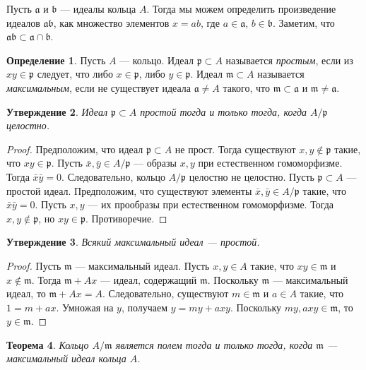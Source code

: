 \documentclass[12pt, titlepage, oneside]{amsbook}
\newcommand{\aaa}{\mathfrak{a}}
\newcommand{\bbb}{\mathfrak{b}}
\newcommand{\ppp}{\mathfrak{p}}
\newcommand{\mmm}{\mathfrak{m}}
\newtheorem{theorem}{Теорема}[chapter]
\newtheorem{claim}[theorem]{Утверждение}
\theoremstyle{definition}
\newtheorem{definition}[theorem]{Определение}
\theoremstyle{remark}
\begin{document}
Пусть $\aaa$ и $\bbb$ --- идеалы кольца $A$. Тогда мы можем определить произведение идеалов $\aaa\bbb$, как множество элементов $x=ab$, где $a\in\aaa$, $b\in\bbb$. Заметим, что $\aaa\bbb\subset\aaa\cap\bbb$.

\begin{definition}
	Пусть $A$ --- кольцо. Идеал $\ppp\subset A$ называется \emph{простым}, если из $xy\in\ppp$ следует, что либо $x\in\ppp$, либо $y\in\ppp$. Идеал $\mmm\subset A$ называется \emph{максимальным}, если не существует идеала $\aaa\neq A$ такого, что $\mmm\subset\aaa$ и $\mmm\neq\aaa$.
\end{definition}

\begin{claim}
	\label{KomKol1}
	Идеал $\ppp\subset A$ простой тогда и только тогда, когда $A/\ppp$ целостно.
\end{claim}

\begin{proof}
	Предположим, что идеал $\ppp\subset A$ не прост. Тогда существуют $x,y\not\in\ppp$ такие, что $xy\in\ppp$. Пусть $\bar{x},\bar{y}\in A/\ppp$ --- образы $x,y$ при естественном гомоморфизме. Тогда $\bar{x}\bar{y}=0$. Следовательно, кольцо $A/\ppp$ целостно не целостно.
	Пусть $\ppp\subset A$ --- простой идеал. Предположим, что существуют элементы $\bar{x},\bar{y}\in A/\ppp$ такие, что $\bar{x}\bar{y}=0$. Пусть $x,y$ --- их прообразы при естественном гомоморфизме. Тогда $x,y\not\in\ppp$, но $xy\in\ppp$. Противоречие.
\end{proof}

\begin{claim}
	\label{KomKol2}
	Всякий максимальный идеал --- простой.
\end{claim}

\begin{proof}
	Пусть $\mmm$ --- максимальный идеал.
	Пусть $x,y\in A$ такие, что $xy\in\mmm$ и $x\not\in\mmm$. Тогда $\mmm+Ax$ --- идеал, содержащий $\mmm$. Поскольку $\mmm$ --- максимальный идеал, то $\mmm+Ax=A$. Следовательно, существуют $m\in\mmm$ и $a\in A$ такие, что $1=m+ax$. Умножая на $y$, получаем $y=my+axy$. Поскольку $my,axy\in\mmm$, то $y\in\mmm$.
\end{proof}

\begin{theorem}
	\label{KomKol3} Кольцо $A/\mmm$ является полем тогда и только тогда, когда $\mmm$ --- максимальный идеал кольца $A$.
\end{theorem}
\end{document}
